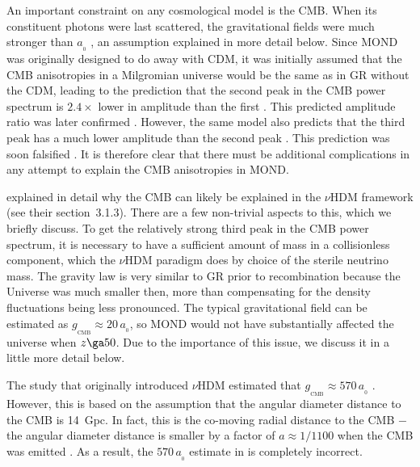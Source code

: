 \documentclass[fleqn,usenatbib,useAMS,onecolumn]{mnras} %
\begin{document}
An important constraint on any cosmological model is the CMB. When its constituent photons were last scattered, the gravitational fields were much stronger than $a_{_0}$ \citep[see figure~1 of][]{Sanders_1998_cosmology}, an assumption explained in more detail below. Since MOND was originally designed to do away with CDM, it was initially assumed that the CMB anisotropies in a Milgromian universe would be the same as in GR without the CDM, leading to the prediction that the second peak in the CMB power spectrum is $2.4\times$ lower in amplitude than the first \citep{McGaugh_1999}. This predicted amplitude ratio was later confirmed \citep{McGaugh_2004}. However, the same model also predicts that the third peak has a much lower amplitude than the second peak \citep{McGaugh_1999}. This prediction was soon falsified \citep{Spergel_2007}. It is therefore clear that there must be additional complications in any attempt to explain the CMB anisotropies in MOND.

\citet{Haslbauer_2020} explained in detail why the CMB can likely be explained in the $\nu$HDM framework (see their section~3.1.3). There are a few non-trivial aspects to this, which we briefly discuss. To get the relatively strong third peak in the CMB power spectrum, it is necessary to have a sufficient amount of mass in a collisionless component, which the $\nu$HDM paradigm does by choice of the sterile neutrino mass. The gravity law is very similar to GR prior to recombination because the Universe was much smaller then, more than compensating for the density fluctuations being less pronounced. The typical gravitational field can be estimated as $g_{_\text{CMB}} \approx 20 \, a_{_0}$, so MOND would not have substantially affected the universe when $z \ga 50$. Due to the importance of this issue, we discuss it in a little more detail below.

The study that originally introduced $\nu$HDM estimated that $g_{_{\text{CMB}}} \approx 570 \, a_{_0}$ \citep[section~1 of][]{Angus_2009}. However, this is based on the assumption that the angular diameter distance to the CMB is 14~Gpc. In fact, this is the co-moving radial distance to the CMB $-$ the angular diameter distance is smaller by a factor of $a \approx 1/1100$ when the CMB was emitted \citep[section~3 of][]{Clarkson_2014}. As a result, the $570 \, a_{_0}$ estimate in \citet{Angus_2009} is completely incorrect.
\end{document}
